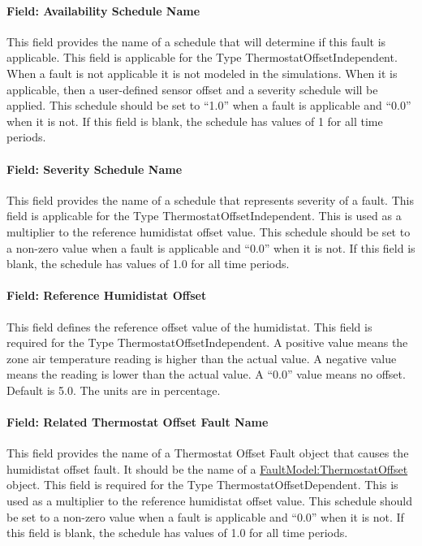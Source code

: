\paragraph{Field: Availability Schedule Name}\label{field-availability-schedule-name-7-002}

This field provides the name of a schedule that will determine if this fault is applicable. This field is applicable for the Type ThermostatOffsetIndependent. When a fault is not applicable it is not modeled in the simulations. When it is applicable, then a user-defined sensor offset and a severity schedule will be applied. This schedule should be set to ``1.0'' when a fault is applicable and ``0.0'' when it is not. If this field is blank, the schedule has values of 1 for all time periods.

\paragraph{Field: Severity Schedule Name}\label{field-severity-schedule-name-7}

This field provides the name of a schedule that represents severity of a fault. This field is applicable for the Type ThermostatOffsetIndependent. This is used as a multiplier to the reference humidistat offset value. This schedule should be set to a non-zero value when a fault is applicable and ``0.0'' when it is not. If this field is blank, the schedule has values of 1.0 for all time periods.

\paragraph{Field: Reference Humidistat Offset}\label{field-reference-humidistat-offset}

This field defines the reference offset value of the humidistat. This field is required for the Type ThermostatOffsetIndependent. A positive value means the zone air temperature reading is higher than the actual value. A negative value means the reading is lower than the actual value. A ``0.0'' value means no offset. Default is 5.0. The units are in percentage.

\paragraph{Field: Related Thermostat Offset Fault Name}\label{field-related-thermostat-offset-fault-name}

This field provides the name of a Thermostat Offset Fault object that causes the humidistat offset fault. It should be the name of a \hyperref[faultmodelthermostatoffset]{FaultModel:ThermostatOffset} object. This field is required for the Type ThermostatOffsetDependent. This is used as a multiplier to the reference humidistat offset value. This schedule should be set to a non-zero value when a fault is applicable and ``0.0'' when it is not. If this field is blank, the schedule has values of 1.0 for all time periods.

